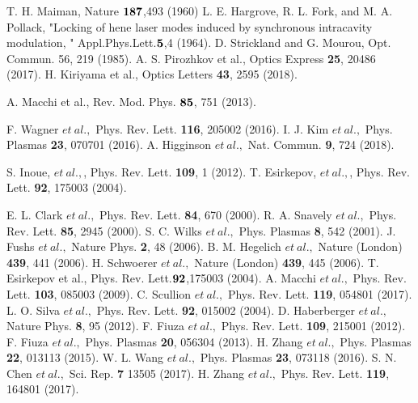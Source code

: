 \documentclass[a4paper,11pt,titlepage]{jarticle}
\numberwithin{equation}{section} %
\begin{document}
\newpage
  \begin{thebibliography}{999}
   T. H. Maiman, Nature $\bf{187}$,493 (1960)
   L. E. Hargrove, R. L. Fork, and M. A. Pollack, "Locking of hene laser modes induced by synchronous intracavity modulation, " Appl.Phys.Lett.$\bf{5}$,4 (1964).
   D. Strickland and G. Mourou, Opt. Commun. 56, 219 (1985).
  A. S. Pirozhkov et al., Optics Express {\bf 25}, 20486 (2017).
  H. Kiriyama et al., Optics Letters {\bf 43}, 2595 (2018).

   A. Macchi et al., Rev. Mod. Phys. $\bf{85}$, 751 (2013).

   F. Wagner $et\ al.,$ Phys. Rev. Lett. {\bf 116}, 205002 (2016).
   I. J. Kim $et\ al.,$ Phys. Plasmas {\bf 23}, 070701 (2016).
   A. Higginson $et\ al.,$ Nat. Commun. {\bf 9}, 724 (2018).

  S. Inoue, $et\ al.,$, Phys. Rev. Lett. {\bf 109}, 1 (2012).
  T. Esirkepov, $et\ al.,$, Phys. Rev. Lett. {\bf92}, 175003 (2004).

  E. L. Clark $et\ al.,$ Phys. Rev. Lett. {\bf 84}, 670 (2000).
  R. A. Snavely $et\ al.,$ Phys. Rev. Lett. {\bf 85}, 2945 (2000).
  S. C. Wilks $et\ al.,$ Phys. Plasmas {\bf 8}, 542 (2001).
  J. Fushs $et\ al.,$ Nature Phys. {\bf 2}, 48 (2006).
  B. M. Hegelich $et\ al.,$ Nature (London) {\bf 439}, 441 (2006).
  H. Schwoerer $et\ al.,$ Nature (London) {\bf 439}, 445 (2006).
   T. Esirkepov et al., Phys. Rev. Lett.$\bf{92}$,175003 (2004).
   A. Macchi $et\ al.,$ Phys. Rev. Lett. {\bf 103}, 085003 (2009).
   C. Scullion $et\ al.,$ Phys. Rev. Lett. {\bf 119}, 054801 (2017).
  L. O. Silva $et\ al.,$ Phys. Rev. Lett. {\bf 92}, 015002 (2004).
  D. Haberberger $et\ al.,$ Nature Phys. {\bf 8}, 95 (2012).
  F. Fiuza $et\ al.,$ Phys. Rev. Lett. {\bf 109}, 215001 (2012).
  F. Fiuza $et\ al.,$ Phys. Plasmas {\bf 20}, 056304 (2013).
  H. Zhang $et\ al.,$ Phys. Plasmas {\bf 22}, 013113 (2015).
  W. L. Wang $et\ al.,$ Phys. Plasmas {\bf 23}, 073118 (2016).
  S. N. Chen $et\ al.,$ Sci. Rep. {\bf 7} 13505 (2017). 
  H. Zhang $et\ al.,$ Phys. Rev. Lett. {\bf 119}, 164801 (2017).



\end{thebibliography}
\end{document}

